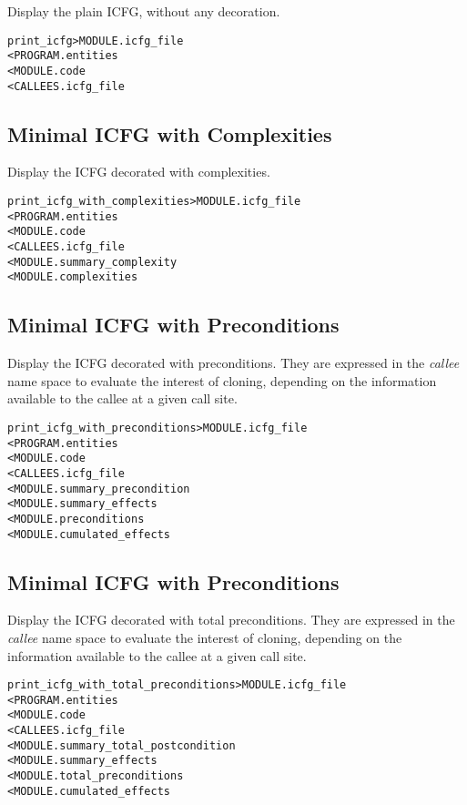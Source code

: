 \documentclass[a4paper]{report}
\newenvironment{PipsMake}{\begin{alltt}}{\end{alltt}}
\newenvironment{PipsPass}[1]{\label{pass:#1}}{}
\begin{document}
\begin{PipsPass}{print_icfg}
Display the plain ICFG, without any decoration.
\end{PipsPass}
\begin{PipsMake}
print_icfg                      > MODULE.icfg_file
        < PROGRAM.entities
        < MODULE.code
        < CALLEES.icfg_file
\end{PipsMake}

\subsection{Minimal ICFG with Complexities}

\begin{PipsPass}{print_icfg_with_complexities}
Display the ICFG decorated with complexities.
\end{PipsPass}
\begin{PipsMake}
print_icfg_with_complexities            > MODULE.icfg_file
        < PROGRAM.entities
        < MODULE.code
        < CALLEES.icfg_file
        < MODULE.summary_complexity
        < MODULE.complexities
\end{PipsMake}

\subsection{Minimal ICFG with Preconditions}

\begin{PipsPass}{print_icfg_with_preconditions}
Display the ICFG decorated with preconditions. They are expressed in the
\emph{callee} name space to evaluate the interest of cloning, depending on
the information available to the callee at a given call site.
\end{PipsPass}
\begin{PipsMake}
print_icfg_with_preconditions            > MODULE.icfg_file
        < PROGRAM.entities
        < MODULE.code
        < CALLEES.icfg_file
        < MODULE.summary_precondition
        < MODULE.summary_effects
        < MODULE.preconditions
        < MODULE.cumulated_effects
\end{PipsMake}

\subsection{Minimal ICFG with Preconditions}

\begin{PipsPass}{print_icfg_with_total_preconditions}
Display the ICFG decorated with total preconditions. They are expressed in the
\emph{callee} name space to evaluate the interest of cloning, depending on
the information available to the callee at a given call site.
\end{PipsPass}
\begin{PipsMake}
print_icfg_with_total_preconditions            > MODULE.icfg_file
        < PROGRAM.entities
        < MODULE.code
        < CALLEES.icfg_file
        < MODULE.summary_total_postcondition
        < MODULE.summary_effects
        < MODULE.total_preconditions
        < MODULE.cumulated_effects
\end{PipsMake}
\end{document}
